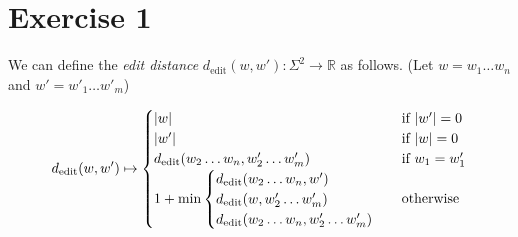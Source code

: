 \documentclass[12pt]{article}
\DeclarePairedDelimiter\abs{\lvert}{\rvert}
\begin{document}
\section*{Exercise 1}
We can define the \textit{edit distance} $d_{\text{edit}}(w,w'): \Sigma^2 \rightarrow \mathbb{R}$ as follows. (Let $w=w_1 \dots w_n$ and $w'=w'_1 \dots w'_m$)

\begin{equation*}
	d_{\text{edit}}(w,w') \mapsto
	\begin{cases}
		\abs{w} & \text{if } \abs{w'}=0 \\
		\abs{w'} & \text{if } \abs{w}=0 \\
		d_{\text{edit}}(w_2 \dots w_n, w'_2 \dots w'_m) & \text{if } w_1 = w'_1 \\
		1 + \min
			\begin {cases}
				d_{\text{edit}}(w_2 \dots w_n, w') \\
				d_{\text{edit}}(w, w'_2 \dots w'_m) \\
				d_{\text{edit}}(w_2 \dots w_n, w'_2 \dots w'_m)
			\end{cases}
			& \text{otherwise}
	\end{cases}
\end{equation*}
\end{document}
